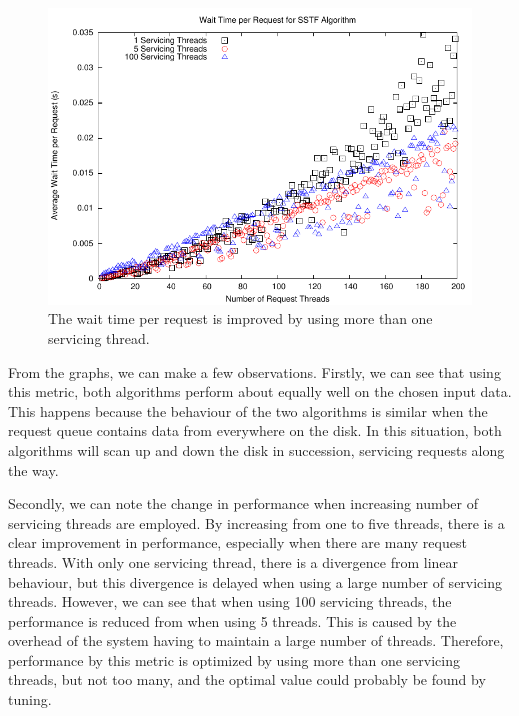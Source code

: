 \documentclass{report}
\begin{document}
\begin{figure}[htb!]
    \centering
    \includegraphics[scale=1]{waittimeSSTF.pdf}
    \caption{The wait time per request is improved by using more than one servicing thread.}
    \label{fig:waittimeSSTF}
\end{figure}
From the graphs, we can make a few observations. Firstly, we can see that using this
metric,
both algorithms perform about equally well on the chosen input data.
This happens because
the behaviour of the two algorithms is similar when the request queue
contains data from everywhere on the disk. In this situation, both algorithms will scan up
and down the disk in succession, servicing requests along the way. 

Secondly, we can note
the change in performance when increasing number of servicing threads are employed. By
increasing from one to five threads, there is a clear improvement in  performance,
especially when there are many request threads. With only one servicing thread,
there is a divergence from linear behaviour, but this divergence is delayed when using a
large number of servicing threads. However, we can see that when using 100 servicing threads, the
performance is reduced from when using 5 threads. This is caused by the overhead of
the system having to maintain a large number of threads. Therefore, performance by this
metric is optimized by using more than one servicing threads, but not too many, and the
optimal value could probably be found by tuning.
\end{document}
